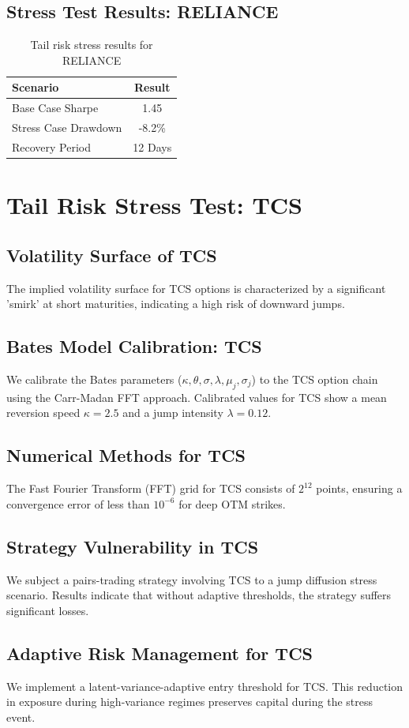 \documentclass[12pt,a4paper,twoside]{article}
\begin{document}
\subsection{Stress Test Results: RELIANCE}
\begin{table}[H]
\centering
\begin{tabular}{|l|c|}
\hline
Scenario & Result \\
\hline
Base Case Sharpe & 1.45 \\
Stress Case Drawdown & -8.2\% \\
Recovery Period & 12 Days \\
\hline
\end{tabular}
\caption{Tail risk stress results for RELIANCE}
\end{table}
\newpage

\section{Tail Risk Stress Test: TCS}
\subsection{Volatility Surface of TCS}
The implied volatility surface for TCS options is characterized by a significant 'smirk' at short maturities, indicating a high risk of downward jumps.
\subsection{Bates Model Calibration: TCS}
We calibrate the Bates parameters ($\kappa, \theta, \sigma, \lambda, \mu_j, \sigma_j$) to the TCS option chain using the Carr-Madan FFT approach.
Calibrated values for TCS show a mean reversion speed $\kappa = 2.5$ and a jump intensity $\lambda = 0.12$.
\subsection{Numerical Methods for TCS}
The Fast Fourier Transform (FFT) grid for TCS consists of $2^{12}$ points, ensuring a convergence error of less than $10^{-6}$ for deep OTM strikes.
\subsection{Strategy Vulnerability in TCS}
We subject a pairs-trading strategy involving TCS to a jump diffusion stress scenario. Results indicate that without adaptive thresholds, the strategy suffers significant losses.
\subsection{Adaptive Risk Management for TCS}
We implement a latent-variance-adaptive entry threshold for TCS. This reduction in exposure during high-variance regimes preserves capital during the stress event.
\end{document}
